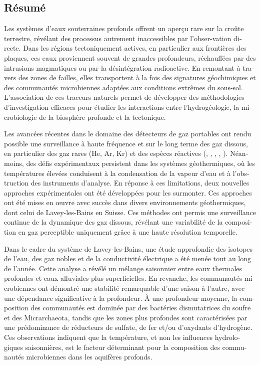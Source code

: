 \begin{otherlanguage}{french}
\chapter*{Résumé}

Les systèmes d'eaux souterraines profonds offrent un aperçu rare sur la croûte terrestre, révélant des processus autrement inaccessibles par l'obser-vation directe.
Dans les régions tectoniquement actives, en particulier aux frontières des plaques, ces eaux proviennent souvent de grandes profondeurs, réchauffées par des intrusions magmatiques ou par la désintégration radioactive.
En remontant à travers des zones de failles, elles transportent à la fois des signatures géochimiques et des communautés microbiennes adaptées aux conditions extrêmes du sous-sol.
L'association de ces traceurs naturels permet de développer des méthodologies d'investigation efficaces pour étudier les interactions entre l'hydrogéologie, la microbiologie de la biosphère profonde et la tectonique.

Les avancées récentes dans le domaine des détecteurs de gaz portables ont rendu possible une surveillance à haute fréquence et sur le long terme des gaz dissous, en particulier des gaz rares (He, Ar, Kr) et des espèces réactives (, , , , ).
Néanmoins, des défis expérimentaux persistent dans les systèmes géothermiques, où les températures élevées conduisent à la condensation de la vapeur d'eau et à l'obstruction des instruments d'analyse.
En réponse à ces limitations, deux nouvelles approches expérimentales ont été développées pour les surmonter.
Ces approches ont été mises en {\oe}uvre avec succès dans divers environnements géothermiques, dont celui de Lavey-les-Bains en Suisse.
Ces méthodes ont permis une surveillance continue de la dynamique des gaz dissous, révélant une variabilité de la composition en gaz perceptible uniquement grâce à une haute résolution temporelle.

Dans le cadre du système de Lavey-les-Bains, une étude approfondie des isotopes de l'eau, des gaz nobles et de la conductivité électrique a été menée tout au long de l'année.
Cette analyse a révélé un mélange saisonnier entre eaux thermales profondes et eaux alluviales plus superficielles.
En revanche, les communautés microbiennes ont démontré une stabilité remarquable d'une saison à l'autre, avec une dépendance significative à la profondeur.
À une profondeur moyenne, la composition des communautés est dominée par des bactéries dismutatrices du soufre et des Micrarchaeota, tandis que les zones plus profondes sont caractérisées par une prédominance de réducteurs de sulfate, de fer et/ou d'oxydants d'hydrogène.
Ces observations indiquent que la température, et non les influences hydrologiques saisonnières, est le facteur déterminant pour la composition des communautés microbiennes dans les aquifères profonds.


\end{otherlanguage}
